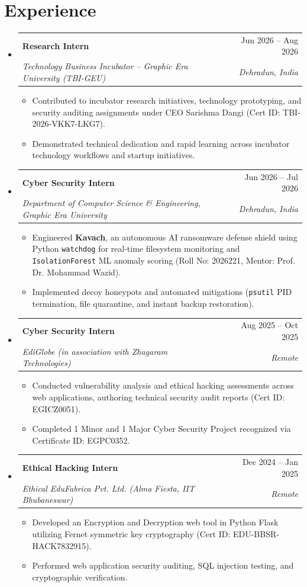 \documentclass[letterpaper,11pt]{article}
\makeatletter
\newcommand{\resumeItem}[1]{
  \item\small{
    {#1 \vspace{-2pt}}
  }
}
\newcommand{\resumeSubheading}[4]{
  \vspace{-2pt}\item
    \begin{tabular*}{\textwidth}[t]{l@{\extracolsep{\fill}}r}
      \textbf{#1} & #2 \\
      \textit{\small#3} & \textit{\small #4} \\
    \end{tabular*}\vspace{-7pt}
}
\newenvironment{itemList}{\begin{itemize}[leftmargin=0.15in, label={}]}{\end{itemize}}
\makeatother
\begin{document}
\section{Experience}
  \begin{itemList}

    \resumeSubheading
      {Research Intern}{Jun 2026 -- Aug 2026}
      {Technology Business Incubator -- Graphic Era University (TBI-GEU)}{Dehradun, India}
      \begin{itemize}
        \resumeItem{Contributed to incubator research initiatives, technology prototyping, and security auditing assignments under CEO Sarishma Dangi (Cert ID: TBI-2026-VKK7-LKG7).}
        \resumeItem{Demonstrated technical dedication and rapid learning across incubator technology workflows and startup initiatives.}
      \end{itemize}

    \resumeSubheading
      {Cyber Security Intern}{Jun 2026 -- Jul 2026}
      {Department of Computer Science \& Engineering, Graphic Era University}{Dehradun, India}
      \begin{itemize}
        \resumeItem{Engineered \textbf{Kavach}, an autonomous AI ransomware defense shield using Python \texttt{watchdog} for real-time filesystem monitoring and \texttt{IsolationForest} ML anomaly scoring (Roll No: 2026221, Mentor: Prof. Dr. Mohammad Wazid).}
        \resumeItem{Implemented decoy honeypots and automated mitigations (\texttt{psutil} PID termination, file quarantine, and instant backup restoration).}
      \end{itemize}

    \resumeSubheading
      {Cyber Security Intern}{Aug 2025 -- Oct 2025}
      {EdiGlobe (in association with Zhagaram Technologies)}{Remote}
      \begin{itemize}
        \resumeItem{Conducted vulnerability analysis and ethical hacking assessments across web applications, authoring technical security audit reports (Cert ID: EGICZ0051).}
        \resumeItem{Completed 1 Minor and 1 Major Cyber Security Project recognized via Certificate ID: EGPC0352.}
      \end{itemize}

    \resumeSubheading
      {Ethical Hacking Intern}{Dec 2024 -- Jan 2025}
      {Ethical EduFabrica Pvt. Ltd. (Alma Fiesta, IIT Bhubaneswar)}{Remote}
      \begin{itemize}
        \resumeItem{Developed an Encryption and Decryption web tool in Python Flask utilizing Fernet symmetric key cryptography (Cert ID: EDU-BBSR-HACK7832915).}
        \resumeItem{Performed web application security auditing, SQL injection testing, and cryptographic verification.}
      \end{itemize}

  \end{itemList}
\end{document}
